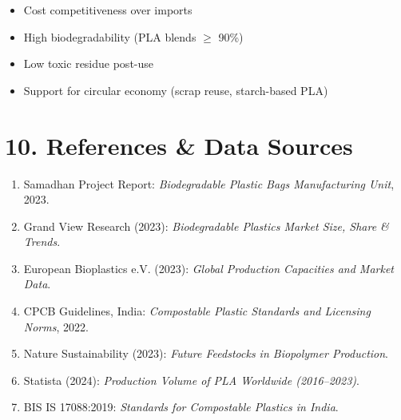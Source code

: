 
\begin{itemize}[label=\textcolor{green}{\checkmark}]
    \item Cost competitiveness over imports
    \item High biodegradability (PLA blends $\geq$ 90\%)
    \item Low toxic residue post-use
    \item Support for circular economy (scrap reuse, starch-based PLA)
\end{itemize}

\vspace{1cm}

\section*{10. References \& Data Sources}
\begin{enumerate}
    \item Samadhan Project Report: \textit{Biodegradable Plastic Bags Manufacturing Unit}, 2023.
    \item Grand View Research (2023): \textit{Biodegradable Plastics Market Size, Share \& Trends}.
    \item European Bioplastics e.V. (2023): \textit{Global Production Capacities and Market Data}.
    \item CPCB Guidelines, India: \textit{Compostable Plastic Standards and Licensing Norms}, 2022.
    \item Nature Sustainability (2023): \textit{Future Feedstocks in Biopolymer Production}.
    \item Statista (2024): \textit{Production Volume of PLA Worldwide (2016--2023)}.
    \item BIS IS 17088:2019: \textit{Standards for Compostable Plastics in India}.
\end{enumerate}

\vspace{1cm}

